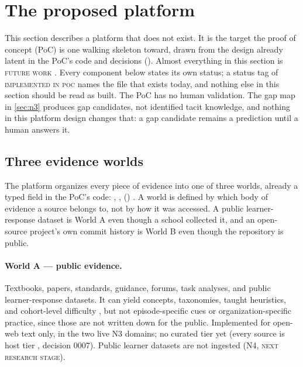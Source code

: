 \section{The proposed platform}
\label{sec:platform}

This section describes a platform that does not exist. It is the target the proof of concept
(PoC) is one walking skeleton toward, drawn from the design already latent in the PoC's code and
decisions (). Almost everything in this section is
\textsc{future work} \evfut. Every component below states its own status; a status tag of
\textsc{implemented in poc} names the file that exists today, and nothing else in this section
should be read as built. The PoC has no human validation. The gap map in
\cref{sec:n3} produces gap candidates, not identified tacit knowledge, and nothing in this
platform design changes that: a gap candidate remains a prediction until a human answers it.

\subsection{Three evidence worlds}
\label{sec:platform-worlds}

The platform organizes every piece of evidence into one of three worlds, already a typed field
in the PoC's code: , ,
 () \evobs. A world is defined by
which body of evidence a source belongs to, not by how it was accessed. A public learner-response
dataset is World A even though a school collected it, and an open-source project's own commit
history is World B even though the repository is public.

\paragraph{World A --- public evidence.}
Textbooks, papers, standards, guidance, forums, task analyses, and public learner-response
datasets. It can yield concepts, taxonomies, taught heuristics, and cohort-level difficulty
\evint, but not episode-specific cues or organization-specific practice, since those are not
written down for the public. \evobs{} Implemented for open-web text only, in the two live N3
domains; no curated tier yet (every source is host tier , decision 0007). Public
learner datasets are not ingested (N4, \textsc{next research stage}).

